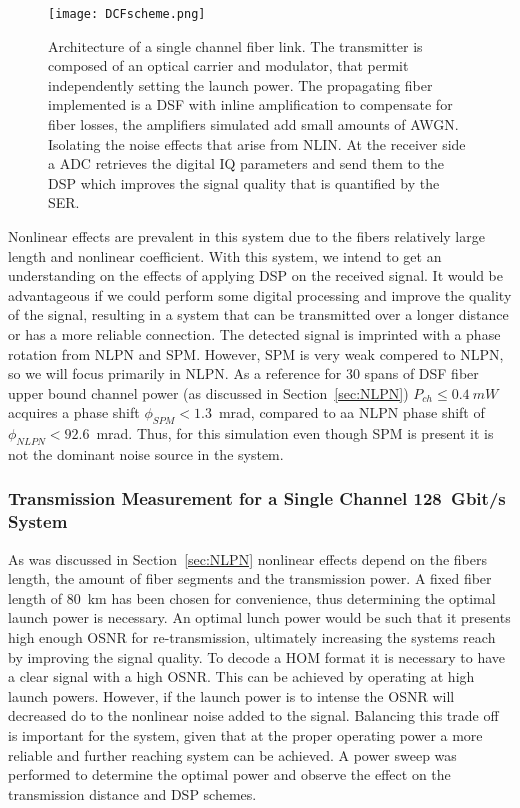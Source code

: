 \begin{figure}[h]
\centering
\texttt{[image: DCFscheme.png]}
\caption{Architecture of a single channel fiber link. The transmitter is composed of an optical carrier and modulator, that permit independently setting the launch power. The propagating fiber implemented is a DSF with inline amplification to compensate for fiber losses, the amplifiers simulated add small amounts of AWGN. Isolating the noise effects that arise from NLIN. At the receiver side a ADC retrieves the digital IQ parameters and send them to the DSP which improves the signal quality that is quantified by the SER. }
\label{fig:1chlink}
\end{figure}
  
Nonlinear effects are prevalent in this system due to the fibers relatively large length and nonlinear coefficient. With this system, we intend to get an understanding on the effects of applying DSP on the received signal. It would be advantageous if we could perform some digital processing and improve the quality of the signal, resulting in a system that can be transmitted over a longer distance or has a more reliable connection. The detected signal is imprinted with a phase rotation from NLPN and SPM. However, SPM is very weak compered to NLPN, so we will focus primarily in NLPN. As a reference for 30 spans of DSF fiber  upper bound channel power (as discussed in Section~\ref{sec:NLPN}) $P_{ch}\le0.4~mW$  acquires a phase shift $\phi_{SPM}< 1.3$~mrad, compared to aa NLPN phase shift of $\phi_{NLPN}< 92.6$~mrad. Thus, for this simulation even though SPM is present it is not the dominant noise source in the system.  


  
\subsubsection{Transmission Measurement for a Single Channel 128~Gbit/s  System}

As was discussed in Section~\ref{sec:NLPN} nonlinear effects depend on the fibers length, the amount of fiber segments and the transmission power. A fixed fiber length of 80~km has been chosen for convenience, thus determining the optimal launch power is necessary. An optimal lunch power would be such that it presents high enough OSNR for re-transmission, ultimately increasing the systems reach by improving the signal quality. To decode a HOM format it is necessary to have a clear signal with a high OSNR. This can be achieved by operating at high launch powers. However, if the launch power is to intense the OSNR will decreased do to the nonlinear noise added to the signal. Balancing this trade off is important for the system, given that at the proper operating power a more reliable and further reaching system can be achieved. A power sweep was performed to determine the optimal power and observe the effect on the transmission distance and DSP schemes.


